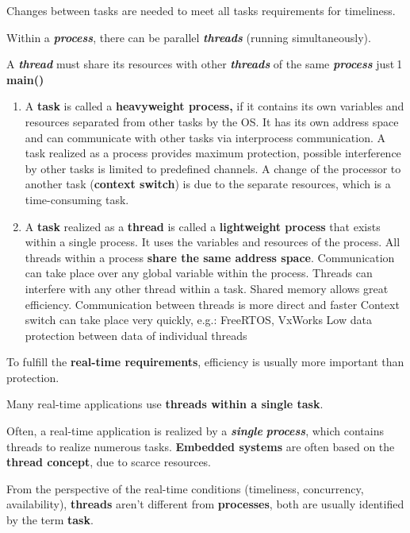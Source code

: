 Changes between tasks are needed to meet all tasks requirements for timeliness.

Within a \textbf{\textit{process}}, there can be parallel \textbf{\textit{threads}} (running simultaneously). 

A \textbf{\textit{thread}} must share its resources with other \textbf{\textit{threads}} of the same \textbf{\textit{process}}  just${}_{\ }$1${}_{\ }$\textbf{main()}

\begin{enumerate}
	\item  A \textbf{task} is called a \textbf{heavyweight process, }if it contains its own variables and resources separated from other tasks by the OS. It has its own address space and can communicate with other tasks via interprocess communication. A task realized as a process provides maximum protection, possible interference by other tasks is limited to predefined channels. A change of the processor to another task (\textbf{context switch}) is due to the separate resources, which is a time-consuming task.
	\item  A \textbf{task} realized as a \textbf{thread} is called a \textbf{lightweight process} that exists within a single process. It uses the variables and resources of the process. All threads within a process \textbf{share the same address space}. Communication can take place over any global variable within the process. Threads can interfere with any other thread within a task.  Shared memory allows great efficiency. Communication between threads is more direct and faster Context switch can take place very quickly, e.g.: FreeRTOS, VxWorks Low data protection between data of individual threads
\end{enumerate}

To fulfill the \textbf{real-time requirements}, efficiency is usually more important than protection. 

Many real-time applications use \textbf{threads within a single task}.

Often, a real-time application is realized by a \textbf{\textit{single}} \textbf{\textit{process}}, which contains threads to realize numerous tasks.\textbf{ Embedded systems} are often based on the \textbf{thread concept}, due to scarce resources.

From the perspective of the real-time conditions (timeliness, concurrency, availability), \textbf{threads} aren't different from \textbf{processes}, both are usually identified by the term \textbf{task}.

